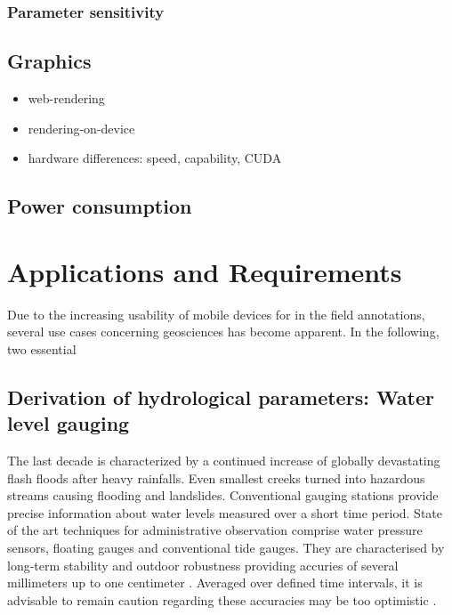 \documentclass[review]{elsarticle}
\begin{document}
\subsubsection{Parameter sensitivity}

\subsection{Graphics}

\begin{itemize}

\item web-rendering
\item rendering-on-device
\item hardware differences: speed, capability, CUDA
\end{itemize}

%

\subsection{Power consumption}



\section{Applications and Requirements}
\label{sec:applications}
Due to the increasing usability of mobile devices for in the field annotations, several use cases concerning geosciences has become apparent. In the following, two essential 

\subsection{Derivation of hydrological parameters: Water level gauging}
\label{sec:water_level_gauging_intro}
The last decade is characterized by a continued increase of globally devastating flash floods after heavy rainfalls. Even smallest creeks turned into hazardous streams causing flooding and landslides. Conventional gauging stations provide precise information about water levels measured over a short time period. State of the art techniques for administrative observation comprise water pressure sensors, floating gauges and conventional tide gauges. They are characterised by long-term stability and outdoor robustness providing accuries of several millimeters up to one centimeter \cite{Siedschlag2015}. Averaged over defined time intervals, it is advisable to remain caution regarding these accuracies may be too optimistic \cite{Horner2018} . 
 
\end{document}
